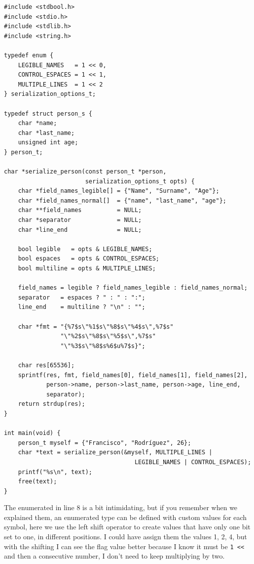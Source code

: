 \documentclass[a4paper]{article}
\begin{document}
\noindent
\begin{minipage}[H]{\linewidth}
\mbox{}
\begin{lstlisting}[style=C, label={lst:options},
caption={Implementation of flags with bit-level operations}]
#include <stdbool.h>
#include <stdio.h>
#include <stdlib.h>
#include <string.h>

typedef enum {
    LEGIBLE_NAMES   = 1 << 0,
    CONTROL_ESPACES = 1 << 1,
    MULTIPLE_LINES  = 1 << 2
} serialization_options_t;

typedef struct person_s {
    char *name;
    char *last_name;
    unsigned int age;
} person_t;

char *serialize_person(const person_t *person,
                       serialization_options_t opts) {
    char *field_names_legible[] = {"Name", "Surname", "Age"};
    char *field_names_normal[]  = {"name", "last_name", "age"};
    char **field_names          = NULL;
    char *separator             = NULL;
    char *line_end              = NULL;

    bool legible   = opts & LEGIBLE_NAMES;
    bool espaces   = opts & CONTROL_ESPACES;
    bool multiline = opts & MULTIPLE_LINES;

    field_names = legible ? field_names_legible : field_names_normal;
    separator   = espaces ? " : " : ":";
    line_end    = multiline ? "\n" : "";

    char *fmt = "{%7$s\"%1$s\"%8$s\"%4$s\",%7$s"
                "\"%2$s\"%8$s\"%5$s\",%7$s"
                "\"%3$s\"%8$s%6$u%7$s}";

    char res[65536];
    sprintf(res, fmt, field_names[0], field_names[1], field_names[2],
            person->name, person->last_name, person->age, line_end,
            separator);
    return strdup(res);
}

int main(void) {
    person_t myself = {"Francisco", "Rodríguez", 26};
    char *text = serialize_person(&myself, MULTIPLE_LINES |
                                     LEGIBLE_NAMES | CONTROL_ESPACES);
    printf("%s\n", text);
    free(text);
}
\end{lstlisting}
\end{minipage}

The enumerated in line 8 is a bit intimidating, but if you remember when
we explained them, an enumerated type can be defined with custom values for
each symbol, here we use the left shift operator to create values that have only
one bit set to one, in different positions. I could have assign them the values
1, 2, 4, but with the shifting I can see the flag value better because I know
it must be \verb!1 <<! and then a consecutive number, I don't need to keep
multiplying by two.
\end{document}
